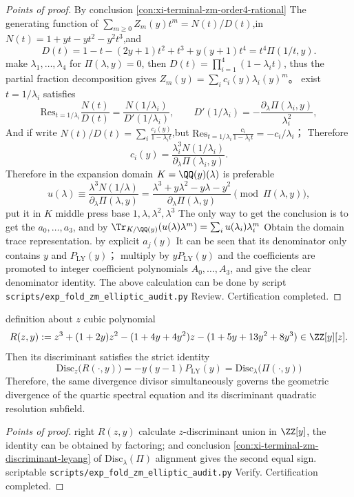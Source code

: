 \begin{proof}[Points of proof]
By conclusion \ref{con:xi-terminal-zm-order4-rational} The generating function of
\(
\sum_{m\ge 0}Z_m(y)t^m=N(t)/D(t)
\),in
\(
N(t)=1+yt-yt^{2}-y^{2}t^{3}
\),and
\[
D(t)=1-t-(2y+1)t^{2}+t^{3}+y(y+1)t^{4}=t^{4}\Pi(1/t,y).
\]
make \(\lambda_1,\dots,\lambda_4\) for \(\Pi(\lambda,y)=0\), then
\(
D(t)=\prod_{i=1}^{4}(1-\lambda_i t)
\), thus the partial fraction decomposition gives \(Z_m(y)=\sum_i c_i(y)\lambda_i(y)^m\)。
exist \(t=1/\lambda_i\) satisfies
\[
\mathrm{Res}_{t=1/\lambda_i}\frac{N(t)}{D(t)}=\frac{N(1/\lambda_i)}{D'(1/\lambda_i)},
\qquad
D'(1/\lambda_i)=-\frac{\partial_\lambda\Pi(\lambda_i,y)}{\lambda_i^{2}},
\]
And if write \(N(t)/D(t)=\sum_i \frac{c_i(y)}{1-\lambda_i t}\),but
\(
\mathrm{Res}_{t=1/\lambda_i}\frac{c_i}{1-\lambda_i t}=-c_i/\lambda_i
\)；
Therefore
\[
c_i(y)=\frac{\lambda_i^{3}N(1/\lambda_i)}{\partial_\lambda\Pi(\lambda_i,y)}.
\]
Therefore in the expansion domain \(K=\QQ(y)(\lambda)\) is preferable
\[
u(\lambda)\equiv \frac{\lambda^{3}N(1/\lambda)}{\partial_\lambda\Pi(\lambda,y)}
=\frac{\lambda^{3}+y\lambda^{2}-y\lambda-y^{2}}{\partial_\lambda\Pi(\lambda,y)}
\pmod{\Pi(\lambda,y)},
\]
put it in \(K\) middle press base \(1,\lambda,\lambda^{2},\lambda^{3}\) The only way to get the conclusion is to get the \(a_0,\dots,a_3\), and by
\(
\Tr_{K/\QQ(y)}(u(\lambda)\lambda^{m})=\sum_i u(\lambda_i)\lambda_i^{m}
\)
Obtain the domain trace representation.
by explicit \(a_j(y)\) It can be seen that its denominator only contains \(y\) and \(P_{\mathrm{LY}}(y)\)；
multiply by \(yP_{\mathrm{LY}}(y)\) and the coefficients are promoted to integer coefficient polynomials \(A_0,\dots,A_3\), and give the clear denominator identity.
The above calculation can be done by script \texttt{scripts/exp\_fold\_zm\_elliptic\_audit.py} Review. Certification completed.
\end{proof}

\begin{conclusion}\label{con:xi-terminal-zm-resolvent-cubic-discriminant-identity}
definition about \(z\) cubic polynomial
\[
R(z,y):=z^{3}+(1+2y)z^{2}-(1+4y+4y^{2})z-(1+5y+13y^{2}+8y^{3})\in\ZZ[y][z].
\]
Then its discriminant satisfies the strict identity
\[
\boxed{\;
\mathrm{Disc}_{z}\bigl(R(\cdot,y)\bigr)
=-y(y-1)P_{\mathrm{LY}}(y)
=\mathrm{Disc}_{\lambda}\bigl(\Pi(\cdot,y)\bigr)\;}
\]
Therefore, the same divergence divisor simultaneously governs the geometric divergence of the quartic spectral equation and its discriminant quadratic resolution subfield.
\end{conclusion}
\begin{proof}[Points of proof]
right \(R(z,y)\) calculate \(z\)-discriminant union in \(\ZZ[y]\), the identity can be obtained by factoring;
and conclusion \ref{con:xi-terminal-zm-discriminant-leyang} of \(\mathrm{Disc}_{\lambda}(\Pi)\) alignment gives the second equal sign.
scriptable \texttt{scripts/exp\_fold\_zm\_elliptic\_audit.py} Verify. Certification completed.
\end{proof}


